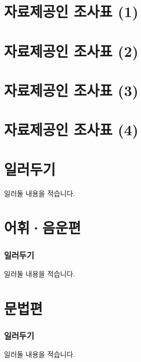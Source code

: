 \documentclass{snu-fl-questionnaire}
\begin{document}
\chapter{자료제공인 조사표 (1)}
\Consultant

\chapter{자료제공인 조사표 (2)}
\Consultant

\chapter{자료제공인 조사표 (3)}
\Consultant

\chapter{자료제공인 조사표 (4)}
\Consultant

\chapter{일러두기}
일러둘 내용을 적습니다.


\mainmatter
\chapter{어휘·음운편}
\subsection{일러두기}
일러둘 내용을 적습니다.

















\chapter{문법편}
\subsection{일러두기}
일러둘 내용을 적습니다.
\end{document}
